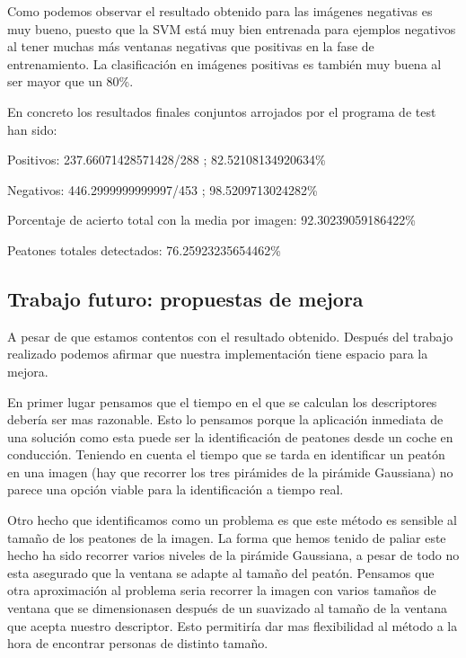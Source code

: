 \documentclass[a4paper,12pt]{article}
\begin{document}
Como podemos observar el resultado obtenido para las imágenes negativas es muy bueno, puesto que la SVM está muy bien entrenada para ejemplos negativos al tener muchas más ventanas negativas que positivas en la fase de entrenamiento. La clasificación en imágenes positivas es también muy buena al ser mayor que un 80\%.

En concreto los resultados finales conjuntos arrojados por el programa de test han sido:

Positivos: 237.66071428571428/288 ; 82.52108134920634\%

Negativos: 446.2999999999997/453 ; 98.5209713024282\%

Porcentaje de acierto total con la media por imagen: 92.30239059186422\%

Peatones totales detectados: 76.25923235654462\%





\subsection{Trabajo futuro: propuestas de mejora}

A pesar de que estamos contentos con el resultado obtenido. Después del trabajo realizado podemos afirmar que nuestra implementación tiene espacio para la mejora.

En primer lugar pensamos que el tiempo en el que se calculan los descriptores debería ser mas razonable. Esto lo pensamos porque la aplicación inmediata de una solución como esta puede ser la identificación de peatones desde un coche en conducción. Teniendo en cuenta el tiempo que se tarda en identificar un peatón en una imagen (hay que recorrer los tres pirámides de la pirámide Gaussiana) no parece una opción viable para la identificación a tiempo real.

Otro hecho que identificamos como un problema es que este método es sensible al tamaño de los peatones de la imagen. La forma que hemos tenido de paliar este hecho ha sido recorrer varios niveles de la pirámide Gaussiana, a pesar de todo no esta asegurado que la ventana se adapte al tamaño del peatón. Pensamos que otra aproximación al problema seria recorrer la imagen con varios tamaños de ventana que se dimensionasen después de un suavizado al tamaño de la ventana que acepta nuestro descriptor. Esto permitiría dar mas flexibilidad al método a la hora de encontrar personas de distinto tamaño.
\end{document}
